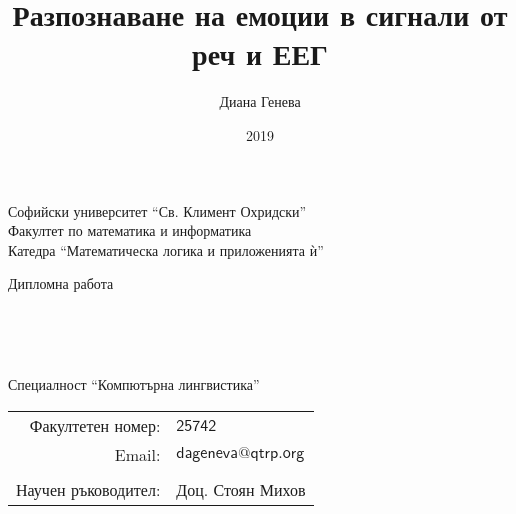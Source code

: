 \documentclass[12pt]{report}
\title{Разпознаване на емоции в сигнали от реч и ЕЕГ}
\author{Диана Генева}
\date{2019}
\makeatletter
\numberwithin{equation}{section}
\numberwithin{figure}{section}
\newcommand{\theemail}{dageneva@qtrp.org}
\makeatother
\begin{document}
\begin{center}
    Софийски университет ``Св. Климент Охридски'' \\
    Факултет по математика и информатика \\
    Катедра ``Математическа логика и приложенията ѝ''
    \vspace{4cm}

    {\LARGE Дипломна работа} \\

    \vspace{1cm}

    {\huge \thetitle} \\

    \vspace{2cm}

    {\LARGE \theauthor} \\

    \vspace{15mm}

    {\large Специалност ``Компютърна лингвистика''} \\

    \vspace{3mm}

    \begin{tabular}{r l}
        Факултетен номер: & $\mathsf{25742}$ \\
        Email: & $\mathsf{\theemail}$ \\

    \vspace{1cm} \\
        \large Научен ръководител: & \large Доц. Стоян Михов \\
    \end{tabular}

    \vspace{4cm}

    {\large \thedate}
\end{center}
\thispagestyle{empty}

\pagebreak
\hypersetup{linkcolor=black}
\tableofcontents
\pagebreak
\hypersetup{linkcolor=Bluish}

\end{document}
